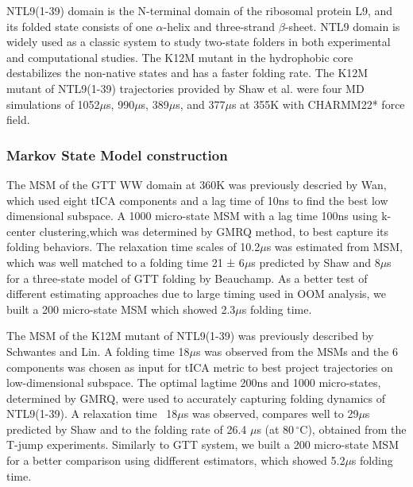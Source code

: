 \documentclass[%
 aip,
rsi,%
 amsmath,amssymb,
 reprint,%
]{revtex4-1}
\begin{document}
NTL9(1-39) domain is the N-terminal domain of the ribosomal protein L9, and its folded state consists of one $\alpha$-helix and three-strand $\beta$-sheet. NTL9 domain is widely used as a classic system to study  two-state folders in both experimental and computational studies\cite{Cho:2004dp,Cho:2005is,Voelz:2010hsa,Hoffman:1994hk,Schwantes:2013bpa}. The K12M mutant in the hydrophobic core destabilizes the non-native states and has a faster folding rate\cite{Cho:2014fla}. The K12M mutant of NTL9(1-39) trajectories provided by Shaw et al. were four MD simulations of 1052$\mu$s, 990$\mu$s, 389$\mu$s, and 377$\mu$s at 355K with CHARMM22* force field\cite{LindorffLarsen:2011gla}.

\subsubsection{Markov State Model construction}

The MSM of the GTT WW domain at 360K was previously descried by Wan\cite{WAN:2016fz}, which used eight tICA components and a lag time of 10ns to find the best low dimensional subspace. A 1000 micro-state MSM with a lag time 100ns using k-center clustering,which was determined by GMRQ method,\cite{McGibbon:2015gm} to best capture its folding behaviors. The relaxation time scales of 10.2$\mu$s was estimated from MSM, which was well matched to a folding time 21 ± 6$\mu$s predicted by Shaw\cite{LindorffLarsen:2011gla} and 8$\mu$s for a three-state model of GTT folding by Beauchamp\cite{Beauchamp:2012kp}. As a better test of different estimating approaches due to large timing used in OOM analysis, we built a 200 micro-state MSM which showed 2.3$\mu$s folding time. 

The MSM of the K12M mutant of NTL9(1-39) was previously described by  Schwantes and Lin\cite{Schwantes:2013bpa,Baiz:2014gm,Beauchamp:2012kp}. A folding time 18$\mu$s was observed from the MSMs and the 6 components was chosen as input for tICA metric to best project trajectories on low-dimensional subspace. The optimal lagtime 200ns and 1000 micro-states, determined by GMRQ\cite{McGibbon:2015gma}, were used to accurately capturing folding dynamics of NTL9(1-39). A relaxation time ~18$\mu$s was observed, compares well to 29$\mu$s predicted by Shaw\cite{LindorffLarsen:2011gla} and to the folding rate of 26.4 $\mu$s (at 80$\,^{\circ}\mathrm{C}$), obtained from the T-jump experiments\cite{Baiz:2014gm}. Similarly to GTT system, we built a 200 micro-state MSM for a better comparison using didfferent estimators, which showed 5.2$\mu$s folding time.
\end{document}
